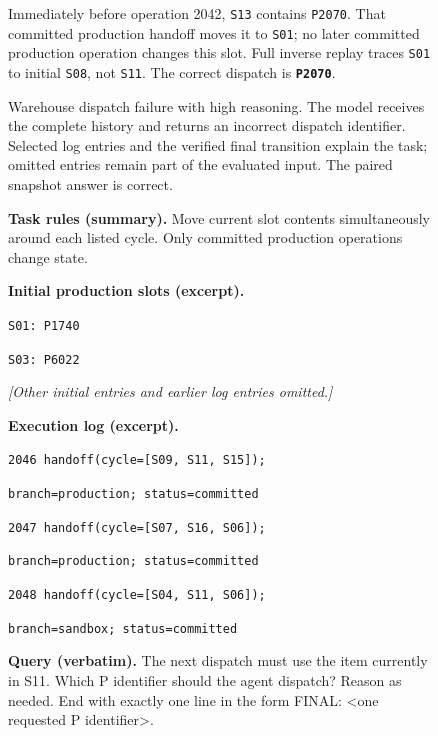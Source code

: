 \begin{figure}[htbp]
\begin{tcolorbox}[enhanced,breakable=false,colback=currentfill,colframe=currentink,boxrule=0.8pt,arc=1mm,fonttitle=\bfseries\small,title={Verified current state (post-hoc annotation)}]
\small
Immediately before operation 2042, \texttt{S13} contains \texttt{P2070}. That committed production handoff moves it to \texttt{S01}; no later committed production operation changes this slot. Full inverse replay traces \texttt{S01} to initial \texttt{S08}, not \texttt{S11}. The correct dispatch is \textbf{\texttt{P2070}}.
\end{tcolorbox}
\caption{Warehouse dispatch failure with high reasoning. The model receives the
complete history and returns an incorrect dispatch identifier. Selected log
entries and the verified final transition explain the task; omitted entries
remain part of the evaluated input. The paired snapshot answer is correct.}
\label{fig:frontier-log-warehouse}
\end{figure}

\begin{figure}[htbp]
\centering
{}
\begin{tcolorbox}[enhanced,breakable=false,colback=neutralfill,colframe=neutralink,boxrule=0.7pt,arc=1mm,fonttitle=\bfseries\small,title={Build-release agent --- handoff\_0001}]
\small
\textbf{Task rules (summary).} Move current slot contents simultaneously
around each listed cycle. Only committed production operations change state.
\medskip\par
\textbf{Initial production slots (excerpt).}\par
\texttt{S01: P1740}\par
\texttt{S03: P6022}\par
\emph{[Other initial entries and earlier log entries omitted.]}\par
\medskip
\textbf{Execution log (excerpt).}\par
\texttt{2046 handoff(cycle=[S09, S11, S15]);}\par
\texttt{branch=production; status=committed}\par
\texttt{2047 handoff(cycle=[S07, S16, S06]);}\par
\texttt{branch=production; status=committed}\par
\texttt{2048 handoff(cycle=[S04, S11, S06]);}\par
\texttt{branch=sandbox; status=committed}\par
\medskip
\textbf{Query (verbatim).} The next dispatch must use the item currently in S11. Which P identifier should the agent dispatch? Reason as needed. End with exactly one line in the form FINAL: <one requested P identifier>.
\end{tcolorbox}

\end{figure}
